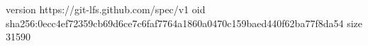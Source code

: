 version https://git-lfs.github.com/spec/v1
oid sha256:0ecc4ef72359cb69d6ce7c6faf7764a1860a0470c159baed440f62ba77f8da54
size 31590
